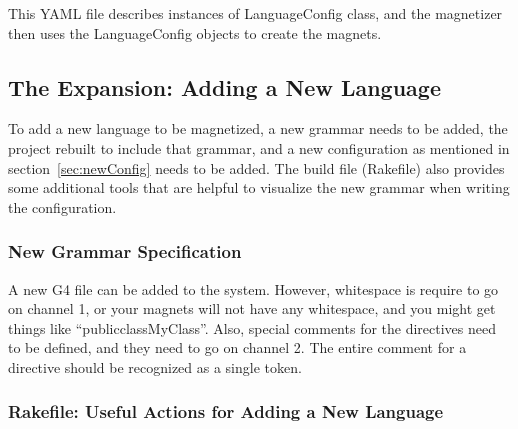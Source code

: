 \documentclass[letter,10pt]{article}
\begin{document}
This YAML file describes instances of LanguageConfig class, and the 
magnetizer then uses the LanguageConfig objects to create the magnets.



\subsection{The Expansion: Adding a New Language}
\label{sec:newLang}

To add a new language to be magnetized, a new grammar needs to be 
added, the project rebuilt to include that grammar, and a new 
configuration as mentioned in section~\ref{sec:newConfig} 
 needs to be added. The build file (Rakefile) 
also provides some additional tools that are helpful to visualize the 
new grammar when writing the configuration.

\subsubsection{New Grammar Specification}
A new G4 file can be added to the system. However, whitespace is
require to go on channel 1, or your magnets will not have any
whitespace, and you might get things like ``publicclassMyClass''. Also, 
special comments for the directives need to be defined, and they need 
to go on channel 2. The entire comment for a directive should be 
recognized as a single token.

\subsubsection{Rakefile: Useful Actions for Adding a New Language}



\clearpage
{}
{}

\end{document}
